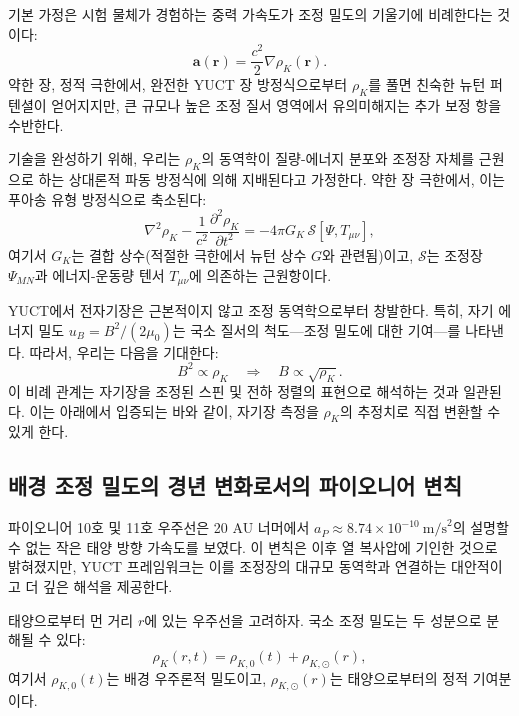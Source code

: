 \documentclass[11pt,a4paper]{article}
\theoremstyle{remark}
\begin{document}
	기본 가정은 시험 물체가 경험하는 중력 가속도가 조정 밀도의 기울기에 비례한다는 것이다:
	\begin{equation}
		\mathbf{a}(\mathbf{r}) = \frac{c^2}{2} \nabla \rho_K(\mathbf{r}).
		\label{eq:coord:grav_from_rho}
	\end{equation}
	약한 장, 정적 극한에서, 완전한 YUCT 장 방정식으로부터 \(\rho_K\)를 풀면 친숙한 뉴턴 퍼텐셜이 얻어지지만, 큰 규모나 높은 조정 질서 영역에서 유의미해지는 추가 보정 항을 수반한다.
	
	기술을 완성하기 위해, 우리는 \(\rho_K\)의 동역학이 질량-에너지 분포와 조정장 자체를 근원으로 하는 상대론적 파동 방정식에 의해 지배된다고 가정한다. 약한 장 극한에서, 이는 푸아송 유형 방정식으로 축소된다:
	\begin{equation}
		\nabla^2 \rho_K - \frac{1}{c^2}\frac{\partial^2 \rho_K}{\partial t^2} = -4\pi G_K \, \mathcal{S}[\Psi, T_{\mu\nu}],
		\label{eq:coord:rho_K_eqn}
	\end{equation}
	여기서 \(G_K\)는 결합 상수(적절한 극한에서 뉴턴 상수 \(G\)와 관련됨)이고, \(\mathcal{S}\)는 조정장 \(\Psi_{MN}\)과 에너지-운동량 텐서 \(T_{\mu\nu}\)에 의존하는 근원항이다.
	
	YUCT에서 전자기장은 근본적이지 않고 조정 동역학으로부터 창발한다. 특히, 자기 에너지 밀도 \(u_B = B^2/(2\mu_0)\)는 국소 질서의 척도—조정 밀도에 대한 기여—를 나타낸다. 따라서, 우리는 다음을 기대한다:
	\begin{equation}
		B^2 \propto \rho_K \quad \Longrightarrow \quad B \propto \sqrt{\rho_K}.
		\label{eq:coord:B_rho}
	\end{equation}
	이 비례 관계는 자기장을 조정된 스핀 및 전하 정렬의 표현으로 해석하는 것과 일관된다. 이는 아래에서 입증되는 바와 같이, 자기장 측정을 \(\rho_K\)의 추정치로 직접 변환할 수 있게 한다.
	
	\subsection{배경 조정 밀도의 경년 변화로서의 파이오니어 변칙}
	\label{subsec:coord:pioneer}
	
	파이오니어 10호 및 11호 우주선은 20 AU 너머에서 \(a_P \approx 8.74 \times 10^{-10}\ \text{m/s}^2\)의 설명할 수 없는 작은 태양 방향 가속도를 보였다. 이 변칙은 이후 열 복사압에 기인한 것으로 밝혀졌지만, YUCT 프레임워크는 이를 조정장의 대규모 동역학과 연결하는 대안적이고 더 깊은 해석을 제공한다.
	
	태양으로부터 먼 거리 \(r\)에 있는 우주선을 고려하자. 국소 조정 밀도는 두 성분으로 분해될 수 있다:
	\begin{equation}
		\rho_K(r,t) = \rho_{K,0}(t) + \rho_{K,\odot}(r),
		\label{eq:coord:rho_decomp}
	\end{equation}
	여기서 \(\rho_{K,0}(t)\)는 배경 우주론적 밀도이고, \(\rho_{K,\odot}(r)\)는 태양으로부터의 정적 기여분이다.
	
\end{document}
